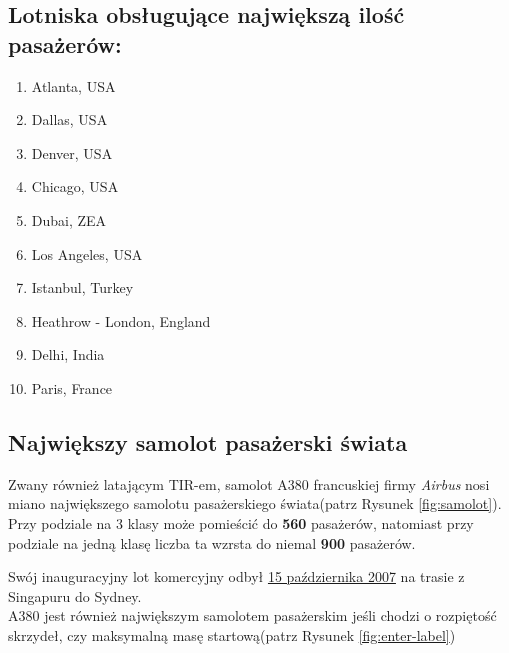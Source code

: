  \subsection*{Lotniska obsługujące największą ilość pasażerów:}
 \begin{enumerate}
     \item Atlanta, USA
     \item Dallas, USA
     \item Denver, USA
     \item Chicago, USA
     \item Dubai, ZEA
     \item Los Angeles, USA
     \item Istanbul, Turkey
     \item Heathrow - London, England
     \item Delhi, India
     \item Paris, France
 \end{enumerate}
 \subsection*{Największy samolot pasażerski świata}
 Zwany również latającym TIR-em, samolot A380 francuskiej firmy \textit{Airbus} nosi miano największego samolotu pasażerskiego świata(patrz Rysunek \ref{fig:samolot}). Przy podziale na 3 klasy może pomieścić do \textbf{560} pasażerów,  natomiast przy podziale na jedną klasę liczba ta wzrsta do niemal \textbf{900} pasażerów.

 Swój inauguracyjny lot komercyjny odbył \underline{15 października 2007} na trasie z Singapuru do Sydney. \\A380 jest również największym samolotem pasażerskim jeśli chodzi o rozpiętość skrzydeł, czy maksymalną masę startową(patrz Rysunek \ref{fig:enter-label})

 